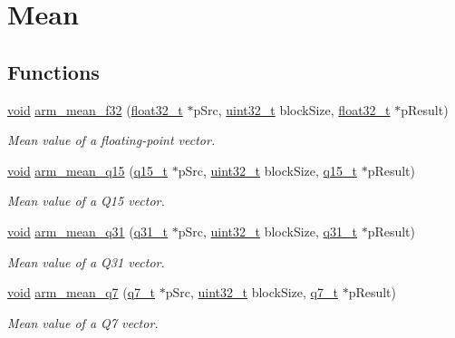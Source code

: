 \hypertarget{group__mean}{\section{Mean}
\label{group__mean}
}
\subsection*{Functions}
\begin{DoxyCompactItemize}
\item 
\hyperlink{group___n_a_m_e_ga18028b8badbf1ea7e704ccac3c488e82}{void} \hyperlink{group__mean_ga74ce08c49ab61e57bd50c3a0ca1fdb2b}{arm\-\_\-mean\-\_\-f32} (\hyperlink{arm__math_8h_a4611b605e45ab401f02cab15c5e38715}{float32\-\_\-t} $\ast$p\-Src, \hyperlink{stdint_8h_a435d1572bf3f880d55459d9805097f62}{uint32\-\_\-t} block\-Size, \hyperlink{arm__math_8h_a4611b605e45ab401f02cab15c5e38715}{float32\-\_\-t} $\ast$p\-Result)
\begin{DoxyCompactList}\small\item\em Mean value of a floating-\/point vector. \end{DoxyCompactList}\item 
\hyperlink{group___n_a_m_e_ga18028b8badbf1ea7e704ccac3c488e82}{void} \hyperlink{group__mean_gac882495d5f098819fd3939c1ef7795b3}{arm\-\_\-mean\-\_\-q15} (\hyperlink{arm__math_8h_ab5a8fb21a5b3b983d5f54f31614052ea}{q15\-\_\-t} $\ast$p\-Src, \hyperlink{stdint_8h_a435d1572bf3f880d55459d9805097f62}{uint32\-\_\-t} block\-Size, \hyperlink{arm__math_8h_ab5a8fb21a5b3b983d5f54f31614052ea}{q15\-\_\-t} $\ast$p\-Result)
\begin{DoxyCompactList}\small\item\em Mean value of a Q15 vector. \end{DoxyCompactList}\item 
\hyperlink{group___n_a_m_e_ga18028b8badbf1ea7e704ccac3c488e82}{void} \hyperlink{group__mean_gacf2526d8c2d75e486e8f0b0e31877ad0}{arm\-\_\-mean\-\_\-q31} (\hyperlink{arm__math_8h_adc89a3547f5324b7b3b95adec3806bc0}{q31\-\_\-t} $\ast$p\-Src, \hyperlink{stdint_8h_a435d1572bf3f880d55459d9805097f62}{uint32\-\_\-t} block\-Size, \hyperlink{arm__math_8h_adc89a3547f5324b7b3b95adec3806bc0}{q31\-\_\-t} $\ast$p\-Result)
\begin{DoxyCompactList}\small\item\em Mean value of a Q31 vector. \end{DoxyCompactList}\item 
\hyperlink{group___n_a_m_e_ga18028b8badbf1ea7e704ccac3c488e82}{void} \hyperlink{group__mean_gaebc707ee539020357c25da4c75b52eb7}{arm\-\_\-mean\-\_\-q7} (\hyperlink{arm__math_8h_ae541b6f232c305361e9b416fc9eed263}{q7\-\_\-t} $\ast$p\-Src, \hyperlink{stdint_8h_a435d1572bf3f880d55459d9805097f62}{uint32\-\_\-t} block\-Size, \hyperlink{arm__math_8h_ae541b6f232c305361e9b416fc9eed263}{q7\-\_\-t} $\ast$p\-Result)
\begin{DoxyCompactList}\small\item\em Mean value of a Q7 vector. \end{DoxyCompactList}\end{DoxyCompactItemize}


